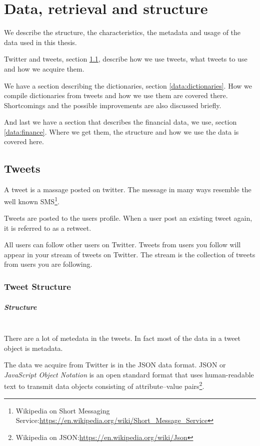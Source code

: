 \chapter{Data, retrieval and structure}\label{data}
We describe the structure, the characteristics, the metadata and usage
of the data used in this thesis. 

Twitter and tweets, section \ref{data:tweets}, describe
how we use tweets, what tweets to use and how we acquire them.

We have a section describing the dictionaries, section \ref{data:dictionaries}.
How we compile dictionaries from tweets and how we use them are covered there.
Shortcomings and the possible improvements are also discussed briefly.   

And last we have a section that describes the financial data, we use, section
\ref{data:finance}. Where we get them, the structure and how we use the data is
covered here. 
%

\section{Tweets}\label{data:tweets}
A tweet is a massage posted on twitter. The message in many ways resemble the
well known SMS\footnote{Wikipedia on Short Messaging
Service:\url{https://en.wikipedia.org/wiki/Short_Message_Service}}.

Tweets are posted to the users profile. When a user post an existing tweet
again, it is referred to as a retweet. 

All users can follow other users on Twitter. Tweets from users you follow will
appear in your stream of tweets on Twitter. The stream is the collection of
tweets from users you are following.  
%

\subsection{Tweet Structure}
\paragraph{Structure}
\hspace{0pt}\\
There are a lot of metedata in the tweets. In fact most of the data in a tweet
object is metadata. 

The data we acquire from Twitter is in the JSON data format. JSON or \textit{JavaScript
Object Notation} is an open standard format that uses human-readable text to
transmit data objects consisting of attribute–value
pairs\footnote{Wikipedia on JSON:\url{https://en.wikipedia.org/wiki/Json}}.

